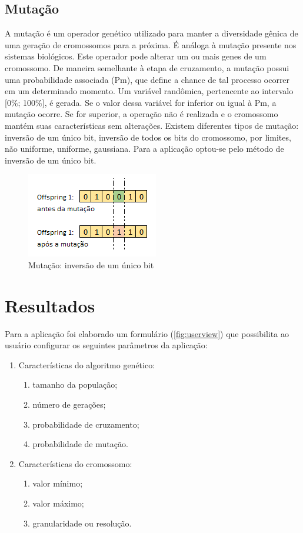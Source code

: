 \documentclass[twoside]{article}
\begin{document}
\begin{multicols}{2}
\subsection{Mutação}
A mutação é um operador genético utilizado para manter a diversidade gênica de uma geração de cromossomos para a próxima. É análoga à mutação presente nos sistemas biológicos. Este operador pode alterar um ou mais genes de um cromossomo. De maneira semelhante à etapa de cruzamento, a mutação possui uma probabilidade associada (Pm), que define a chance de tal processo ocorrer em um determinado momento. Um variável randômica, pertencente ao intervalo [0\%; 100\%], é gerada. Se o valor dessa variável for inferior ou igual à Pm, a mutação ocorre. Se for superior, a operação não é realizada e o cromossomo mantém suas características sem alterações.
Existem diferentes tipos de mutação: inversão de um único bit, inversão de todos os bits do cromossomo, por limites, não uniforme, uniforme, gaussiana. Para a aplicação optou-se pelo método de inversão de um único bit.

\begin{figure}[H]
\label{fig:mut}
  \caption{Mutação: inversão de um único bit}
  \centering
    \includegraphics[scale = 0.9]{mutation.png}
\end{figure}


\section{Resultados}
Para a aplicação foi elaborado um formulário (\ref {fig:userview}) que possibilita ao usuário configurar os seguintes parâmetros da aplicação:
\begin{enumerate}
\item Características do algoritmo genético:
\begin{enumerate}
\item tamanho da população;
\item número de gerações;
\item probabilidade de cruzamento;
\item probabilidade de mutação.
\end{enumerate}
\item Características do cromossomo:
\begin{enumerate}
\item valor mínimo;
\item valor máximo;
\item granularidade ou resolução.
\end{enumerate}
\end{enumerate}


\end{multicols}
\end{document}
